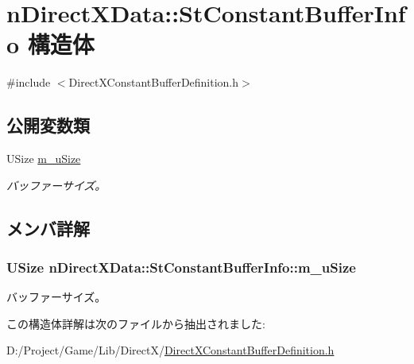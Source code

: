 \hypertarget{structn_direct_x_data_1_1_st_constant_buffer_info}{}\section{n\+Direct\+X\+Data\+:\+:St\+Constant\+Buffer\+Info 構造体}
\label{structn_direct_x_data_1_1_st_constant_buffer_info}


{\ttfamily \#include $<$Direct\+X\+Constant\+Buffer\+Definition.\+h$>$}

\subsection*{公開変数類}
\begin{DoxyCompactItemize}
\item 
U\+Size \hyperlink{structn_direct_x_data_1_1_st_constant_buffer_info_aec0c961f4d40b06d5410ac62cf52bb2f}{m\+\_\+u\+Size}
\begin{DoxyCompactList}\small\item\em バッファーサイズ。 \end{DoxyCompactList}\end{DoxyCompactItemize}


\subsection{メンバ詳解}
\hypertarget{structn_direct_x_data_1_1_st_constant_buffer_info_aec0c961f4d40b06d5410ac62cf52bb2f}{}
\subsubsection[{m\+\_\+u\+Size}]{\setlength{\rightskip}{0pt plus 5cm}U\+Size n\+Direct\+X\+Data\+::\+St\+Constant\+Buffer\+Info\+::m\+\_\+u\+Size}\label{structn_direct_x_data_1_1_st_constant_buffer_info_aec0c961f4d40b06d5410ac62cf52bb2f}


バッファーサイズ。 



この構造体詳解は次のファイルから抽出されました\+:\begin{DoxyCompactItemize}
\item 
D\+:/\+Project/\+Game/\+Lib/\+Direct\+X/\hyperlink{_direct_x_constant_buffer_definition_8h}{Direct\+X\+Constant\+Buffer\+Definition.\+h}\end{DoxyCompactItemize}
